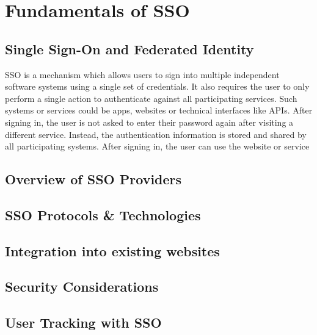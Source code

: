 \section{Fundamentals of \ac{SSO}}


\subsection{Single Sign-On and Federated Identity}

\ac{SSO} is a mechanism which allows users to sign into multiple independent software systems
using a single set of credentials.
It also requires the user to only perform a single action to authenticate against all participating services.
Such systems or services could be apps, websites or technical interfaces like \acp{API}.
After signing in, the user is not asked to enter their password again after visiting a different service.
Instead, the authentication information is stored and shared by all participating systems.
After signing in, the user can use the website or service 




\subsection{Overview of \ac{SSO} Providers}


\subsection{\ac{SSO} Protocols \& Technologies}

\subsection{Integration into existing websites}

\subsection{Security Considerations}

\subsection{User Tracking with \ac{SSO}}